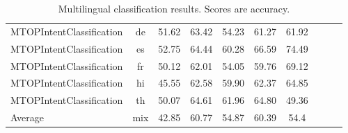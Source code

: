 \documentclass[11pt]{article}
\begin{document}
\begin{table*}[t!]
{\begin{tabular}{lc|cccccccc}
MTOPIntentClassification & de & 51.62 & 63.42 & 54.23 & 61.27 & 61.92 \\
MTOPIntentClassification & es & 52.75 & 64.44 & 60.28 & 66.59 & 74.49 \\
MTOPIntentClassification & fr & 50.12 & 62.01 & 54.05 & 59.76 & 69.12 \\
MTOPIntentClassification & hi & 45.55 & 62.58 & 59.90 & 62.37 & 64.85 \\
MTOPIntentClassification & th & 50.07 & 64.61 & 61.96 & 64.80 & 49.36 \\
\midrule
\midrule
Average & mix & 42.85 & 60.77 & 54.87 & 60.39 & 54.4 \\
   \bottomrule
    \end{tabular}}
    \caption{Multilingual classification results. Scores are accuracy.}
    \label{tab:addresultsmultclf}
\end{table*}
\end{document}
